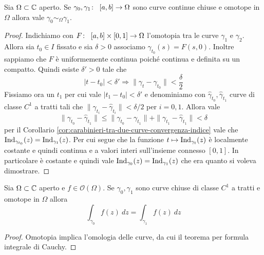 \begin{theorem}
  Sia $\Omega \subset \mathbb{C}$ aperto. Se $\gamma_0, \gamma_1 \colon\ \left[
  a,b \right] \rightarrow \Omega$ sono curve continue chiuse e omotope in $\Omega$
  allora vale $\gamma_0 \sim_\Omega \gamma_1$.
  \label{thr:omotopia-implica-omologia}
\end{theorem}
\begin{proof}
  Indichiamo con $F \colon\ \left[ a,b \right]\times \left[ 0,1
  \right] \rightarrow \Omega$ l'omotopia tra le curve $\gamma_1$ e $\gamma_2$. Allora
  sia $t_0 \in I$ fissato e sia $\delta > 0$ associamo $\gamma_{t_0}(s) 
  = F(s, 0)$. Inoltre sappiamo che $F$ è uniformemente continua poiché
  continua e definita su un compatto. Quindi esiste $\delta' >0$ tale che 
  \begin{equation*}
    |t-t_0| < \delta' \Longrightarrow \|\gamma_t - \gamma_{t_0}\| < \frac{\delta}{2}
  \end{equation*}
  Fissiamo ora un $t_1$ per cui vale $|t_1- t_0| < \delta'$ e denominiamo
  con $\hat{\gamma}_{t_0}, \hat{\gamma}_{t_1}$ curve di classe $C^1$
  a tratti tali che $\|\gamma_{t_i} - \hat{\gamma}_{t_i}\| < \delta/2$ per
  $i = 0,1$. Allora vale 
  \begin{equation*}
    \|\gamma_{t_0} - \hat{\gamma}_{t_1}\| \le \|\gamma_{t_0}
    - \gamma_{t_1}\| + \|\gamma_{t_1} - \hat{\gamma}_{t_1}\| < \delta
  \end{equation*}
  per il Corollario \ref{cor:carabinieri-tra-due-curve-convergenza-indice}
  vale che $\operatorname{Ind}_{\gamma_{t_0}}(z)
  = \operatorname{Ind}_{{\gamma}_1}(z)$. Per cui segue che la funzione $t
  \mapsto \operatorname{Ind}_{\gamma_t}(z)$ è localmente costante e quindi
  continua e a valori interi sull'insieme connesso $\left[ 0,1 \right]$. In
  particolare è costante e quindi vale $\operatorname{Ind}_{\gamma_0}(z)
  = \operatorname{Ind}_{\gamma_1}(z)$ che era quanto si voleva dimostrare.
\end{proof}

\begin{corollary}
  Sia $\Omega \subset \mathbb{C}$ aperto e $f \in \mathcal{O}(\Omega)$. Se
  $\gamma_0, \gamma_1$ sono curve chiuse di classe $C^1$ a tratti e omotope
  in $\Omega$ allora 
  \begin{equation*}
    \int_{\gamma_0} f(z)\ dz =  \int_{\gamma_1} f(z)\ dz
  \end{equation*}
  \label{cor:omotopia-implica-integrali-di-linea-uguali}
\end{corollary}
\begin{proof}
  Omotopia implica l'omologia delle curve, da cui il teorema per formula
  integrale di Cauchy.
\end{proof}

